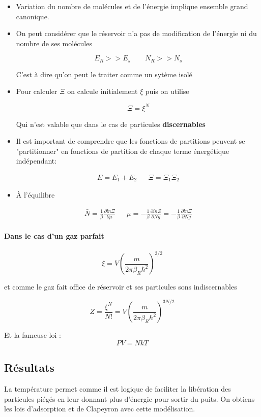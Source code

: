 \begin{itemize}[label=]

	\item Variation du nombre de molécules et de l'énergie implique ensemble grand canonique.

	\item On peut considérer que le réservoir n'a pas de modification de l'énergie ni du nombre de ses molécules

	\[
		E_R>>E_s \qquad N_R>>N_s
	\]

	C'est à dire qu'on peut le traiter comme un sytème isolé

	\item Pour calculer $\Xi$ on calcule initialement $\xi$ puis on utilise 

	\[
		\Xi=\xi^N
	\]

	Qui n'est valable que dans le cas de particules \textbf{discernables}

	\item Il est important de comprendre que les fonctions de partitions peuvent se "partitionner" en fonctions de partition de chaque terme énergétique indépendant:

	\begin{align*}
		E=E_1+E_2 && \Xi= \Xi_1 \Xi_2
	\end{align*}


	\item À l'équilibre 

	\begin{align*}
		\bar{N}= \frac{1}{\beta}\frac{\partial ln\Xi}{\partial \mu}
		&& \mu=-\frac{1}{\beta}\frac{\partial lnZ}{\partial Ng}=-\frac{1}{\beta}\frac{\partial ln\Xi}{\partial Ng}
	\end{align*}

\end{itemize}


\paragraph{Dans le cas d'un gaz parfait} 

\[
	\xi = V\left(\frac{m}{2 \pi \beta_R \hbar^2}\right)^{3/2}
\]

et comme le gaz fait office de réservoir et ses particules sons indiscernables

\[
	Z= \frac{\xi^N}{N!}=V\left(\frac{m}{2 \pi \beta_R \hbar^2}\right)^{3N/2}
\]

Et la fameuse loi : 
\[
	PV=NkT
\]


\subsection{Résultats}


La température permet comme il est logique de faciliter la libération des particules piégés en leur donnant plus d'énergie pour sortir du puits.
On obtiens les lois d'adsorption et de Clapeyron avec cette modélisation.